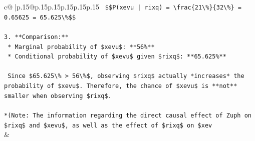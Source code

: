 \documentclass{article}
\begin{document}
{\begin{supertabular}{c@{$\;$}|p{.15\linewidth}@{}p{.15\linewidth}p{.15\linewidth}p{.15\linewidth}p{.15\linewidth}p{.15\linewidth}}
{{{\texttt{    \$\$P(xevu | rixq) = \textbackslash{}frac\{21\textbackslash{}\%\}\{32\textbackslash{}\%\} = 0.65625 = 65.625\textbackslash{}\%\$\$} \\
\\ 
\texttt{3.  **Comparison:**} \\
\texttt{    *   Marginal probability of \$xevu\$: **56\%**} \\
\texttt{    *   Conditional probability of \$xevu\$ given \$rixq\$: **65.625\%**} \\
\\ 
\texttt{    Since \$65.625\textbackslash{}\% > 56\textbackslash{}\%\$, observing \$rixq\$ actually *increases* the probability of \$xevu\$. Therefore, the chance of \$xevu\$ is **not** smaller when observing \$rixq\$.} \\
\\ 
\texttt{*(Note: The information regarding the direct causal effect of Zuph on \$rixq\$ and \$xevu\$, as well as the effect of \$rixq\$ on \$xev} \\
            }
        }
    }
    & \\ \\


\end{supertabular}}
\end{document}

